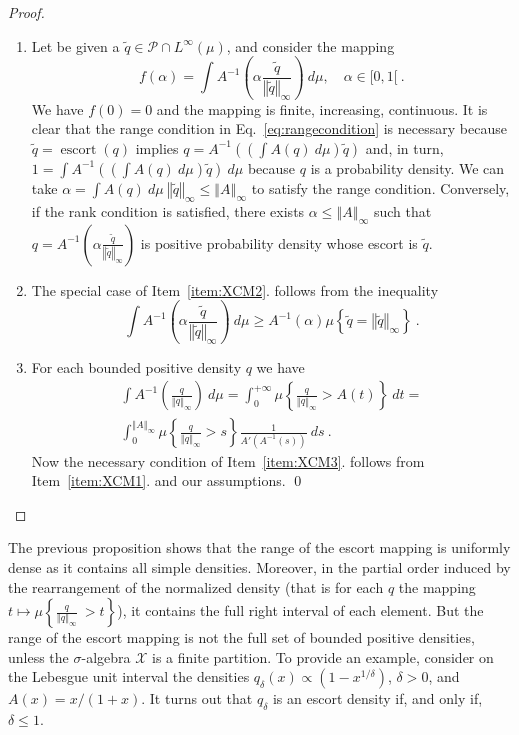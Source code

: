 \documentclass[graybox]{svmult}
\newcommand{\escortof}[1]{\operatorname{escort}\left(#1\right)}
\newcommand{\normat}[2]{\left\Vert#2\right\Vert_{#1}}
\newcommand{\set}[1]{\left\{#1\right\}}
\begin{document}
\begin{proof}
  \begin{enumerate}
  \item
    Let be given a $\widetilde{q}\in \mathcal{P}\cap L^{\infty }(\mu )$, and consider the mapping
\begin{equation*}
  f(\alpha) = \int A^{-1}\left(\alpha \frac{\widetilde q}{\normat \infty {\widetilde q}}\right)\ d\mu, \quad \alpha \in [0,1[ \ .
\end{equation*}
We have $f(0)=0$ and the mapping is finite, increasing, continuous.
It is clear that the range condition in Eq.~\eqref{eq:rangecondition} is necessary because $\widetilde q = \escortof q$ implies $q = A^{-1}\left(\left(\int A(q)\ d\mu\right)\widetilde q\right)$ and, in turn, $1 =  \int A^{-1}\left(\left(\int A(q)\ d\mu\right)\widetilde q\right) \ d\mu$ because $q$ is a probability density. We can take $\alpha = \int A(q)\ d\mu \ \normat \infty {\widetilde q} \le \normat \infty A$ to satisfy the range condition. Conversely, if the rank condition is satisfied, there exists $\alpha \le \normat \infty A$ such that $q = A^{-1}\left(\alpha \frac{\widetilde q}{\normat \infty {\widetilde q}}\right)$ is positive probability density whose escort is $\widetilde q$. 
\item The special case of Item~\ref{item:XCM2}. follows from the inequality
  \begin{equation*}
    \int A^{-1}\left(\alpha \frac{\widetilde q}{\normat \infty {\widetilde q}}\right)\ d\mu  \ge A^{-1}(\alpha)\mu\set{\widetilde q = \normat \infty {\widetilde q}} \ .
  \end{equation*}
\item For each bounded positive density $q$ we have
\begin{multline*}
 \int A^{-1}\left(\frac{q}{\normat \infty {q}}\right)\ d\mu = \int_0^{+\infty} \mu\set{\frac{q}{\normat \infty {q}} > A(t)} \ dt = \\ \int_0^{\normat \infty A} \mu\set{\frac{q}{\normat \infty {q}} > s} \frac1{A'\left(A^{-1}(s)\right)} \ ds \ . 
\end{multline*}
Now the necessary condition of Item~\ref{item:XCM3}. follows from Item~\ref{item:XCM1}. and our assumptions.
\qed
\end{enumerate}
\end{proof}

The previous proposition shows that the range of the escort mapping is uniformly dense as it contains all simple densities. Moreover, in the partial order induced by the rearrangement of the normalized density (that is for each $q$ the mapping $t \mapsto \mu\set{\frac q {\normat \infty q} \
> t}$), it contains the full right interval of each element. But the range of the escort mapping is not the full set of bounded positive densities, unless the $\sigma$-algebra $\mathcal X$ is a finite partition. To provide an example, consider on the Lebesgue unit interval the densities $q_{\delta}(x) \propto (1 - x^{1/\delta})$, $\delta > 0$, and $A(x)=x/(1+x)$. It turns out that $q_{\delta}$ is an escort density if, and only if, $\delta \le 1$.
\end{document}
